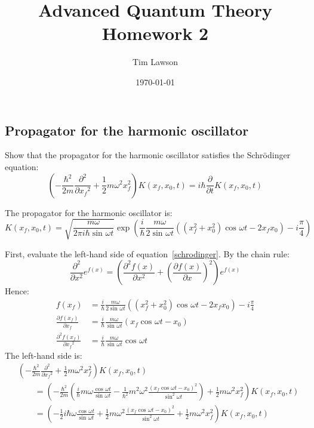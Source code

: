 \documentclass[a4paper]{extarticle}
\title{Advanced Quantum Theory\\
\large Homework 2}
\author{Tim Lawson}
\date{\today}
\newcommand{\half}{\frac{1}{2}}
\newcommand{\ihbar}{\frac{i}{\hbar}}
\newcommand{\w}{\omega}
\newcommand{\sinwt}[1][]{\sin^{#1}\omega t}
\newcommand{\coswt}[1][]{\cos^{#1}\omega t}
\newcommand{\del}[2][]{\frac{\partial{#1}}{\partial{#2}}}
\newcommand{\delsq}[2][]{\frac{\partial^2{#1}}{\partial{#2}^2}}
\newcommand{\propagator}{K(x_f, x_0, t)}
\begin{document}
\maketitle

\setcounter{section}{2}
\setcounter{subsection}{1}

\subsection{Propagator for the harmonic oscillator}

Show that the propagator for the harmonic oscillator satisfies the
Schr\"{o}dinger equation:
\begin{equation}
  \label{schrodinger}
  \left(-\frac{\hbar^2}{2m}\delsq{x_f} + \half m\w ^2 x_f^2\right) \propagator
  =
  i\hbar\del{t}\propagator
\end{equation}

The propagator for the harmonic oscillator is:
\begin{equation}
  \label{propagator}
  \propagator
  =
  \sqrt{\frac{m\w }{2\pi i\hbar\sinwt}}
  \exp\left(
  \ihbar\frac{m\w }{2\sinwt}\left(
  (x_f^2 + x_0^2)\coswt - 2x_f x_0
  \right) - i\frac{\pi}{4}
  \right)
\end{equation}

First, evaluate the left-hand side of equation~\ref{schrodinger}.
By the chain rule:
\begin{equation*}
  \delsq{x} e^{f(x)}
  =
  \left(\delsq[f(x)]{x} + \left(\del[f(x)]{x}\right)^2\right) e^{f(x)}
\end{equation*}
Hence:
\begin{align*}
  f(x_f)
   & =
  \ihbar\frac{m\w }{2\sinwt}\left(
  (x_f^2 + x_0^2)\coswt - 2x_f x_0
  \right) - i\frac{\pi}{4}
  \\[2ex]
  \del[f(x_f)]{x_f}
   & =
  \ihbar\frac{m\w }{\sinwt}\left(
  x_f\coswt - x_0
  \right)
  \\[2ex]
  \delsq[f(x_f)]{x_f}
   & =
  \ihbar\frac{m\w }{\sinwt}\coswt
\end{align*}
The left-hand side is:
\begin{align}
   & \left(-\frac{\hbar^2}{2m}\delsq{x_f} +
  \half m\w ^2 x_f^2\right) \propagator
  \nonumber
  \\[2ex]
   & \qquad =
  \left(
  -\frac{\hbar^2}{2m}\left(
    \ihbar m\w\frac{\coswt}{\sinwt} -
    \frac{1}{\hbar^2}m^2\w ^2 \frac{(x_f \coswt - x_0)^2}{\sinwt[2]}
    \right) +
  \half m\w ^2 x_f^2
  \right)
  \propagator
  \nonumber
  \\[2ex]
  \label{lhs}
   & \qquad =
  \left(
  -\half i\hbar\w\frac{\coswt}{\sinwt} +
  \half m\w^2\frac{(x_f \coswt - x_0)^2}{\sinwt[2]} +
  \half m\w ^2 x_f^2
  \right)
  \propagator
\end{align}
\end{document}
